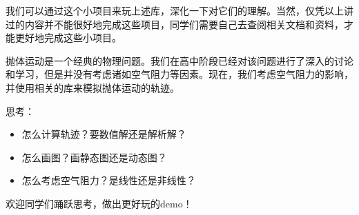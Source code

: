\documentclass[../main.tex]{subfiles}
\begin{document}
我们可以通过这个小项目来玩上述库，深化一下对它们的理解。当然，仅凭以上讲过的内容并不能很好地完成这些项目，同学们需要自己去查阅相关文档和资料，才能更好地完成这些小项目。

抛体运动是一个经典的物理问题。我们在高中阶段已经对该问题进行了深入的讨论和学习，但是并没有考虑诸如空气阻力等因素。现在，我们考虑空气阻力的影响，并使用相关的库来模拟抛体运动的轨迹。

思考：
\begin{itemize}
    \item 怎么计算轨迹？要数值解还是解析解？
    \item 怎么画图？画静态图还是动态图？
    \item 怎么考虑空气阻力？是线性还是非线性？
\end{itemize}

欢迎同学们踊跃思考，做出更好玩的demo！
\end{document}
